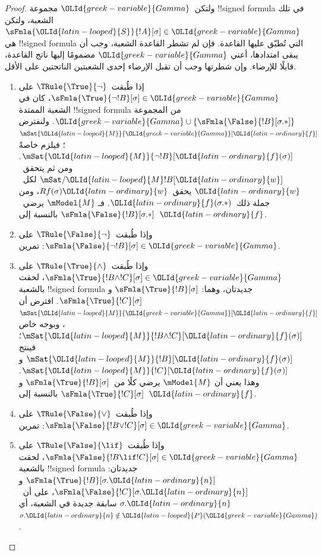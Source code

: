 \documentclass[../../../include/open-logic-section]{subfiles}
\begin{document}
\begin{proof}
ولتكن~${\OLId{greek-variable}{Gamma}}$ مجموعة !!{signed formula} في تلك الشعبة، ولتكن
$\sFmla{{\OLId{latin-looped}{S}}}{!A}[\sigma] \in {\OLId{greek-variable}{Gamma}}$ هي !!{signed formula} التي تُطبّق
عليها القاعدة. فإن لم تشطر القاعدة الشعبة، وجب أن يبقى امتدادها، أعني
${\OLId{greek-variable}{Gamma}}$ مضمومًا إليها ناتج القاعدة، قابلًا للإرضاء. وإن شطرتها وجب أن
تقبل الإرضاء إحدى الشعبتين الناتجتين على الأقل.
\begin{enumerate}
\item إذا طُبقت~$\TRule{\True}{\lnot}$ على
  $\sFmla{\True}{\lnot !B}[\sigma] \in {\OLId{greek-variable}{Gamma}}$، كان في الشعبة
  الممتدة !!{signed formula} من المجموعة
  ${\OLId{greek-variable}{Gamma}} \cup \{\sFmla{\False}{!B}[\sigma.{*}]\}$. ولنفترض
  $\mSat{{\OLId{latin-looped}{M}}}{{\OLId{greek-variable}{Gamma}}}[{\OLId{latin-ordinary}{f}}]$؛ فيلزم خاصةً
  $\mSat{{\OLId{latin-looped}{M}}}{\lnot !B}[{\OLId{latin-ordinary}{f}}(\sigma)]$. ومن ثم يتحقق~$\mSat/{{\OLId{latin-looped}{M}}}{!B}[{\OLId{latin-ordinary}{w}}]$
  لكل~${\OLId{latin-ordinary}{w}}$ يحقق~$Rf(\sigma){\OLId{latin-ordinary}{w}}$، ومن جملة ذلك~${\OLId{latin-ordinary}{f}}(\sigma.{*})$. فـ
  $\mModel{M}$ يرضي~$\sFmla{\False}{!B}[\sigma.{*}]$ بالنسبة إلى~${\OLId{latin-ordinary}{f}}$.
\item وإذا طُبقت~$\TRule{\False}{\lnot}$ على
  $\sFmla{\False}{\lnot !B}[\sigma] \in {\OLId{greek-variable}{Gamma}}$: تمرين.
\item وإذا طُبقت~$\TRule{\True}{\land}$ على
  $\sFmla{\True}{!B \land !C}[\sigma] \in {\OLId{greek-variable}{Gamma}}$، لحقت بالشعبة
  !!{signed formula} جديدتان، وهما:
  $\sFmla{\True}{!B}[\sigma]$ و$\sFmla{\True}{!C}[\sigma]$. افترض أن
  $\mSat{{\OLId{latin-looped}{M}}}{{\OLId{greek-variable}{Gamma}}}[{\OLId{latin-ordinary}{f}}]$، وبوجه خاص
  $\mSat{{\OLId{latin-looped}{M}}}{!B \land !C}[{\OLId{latin-ordinary}{f}}(\sigma)]$؛ فينتج
  $\mSat{{\OLId{latin-looped}{M}}}{!B}[{\OLId{latin-ordinary}{f}}(\sigma)]$ و$\mSat{{\OLId{latin-looped}{M}}}{!C}[{\OLId{latin-ordinary}{f}}(\sigma)]$. وهذا يعني أن
  $\mModel{M}$ يرضي كلًا من~$\sFmla{\True}{!B}[\sigma]$
  و$\sFmla{\True}{!C}[\sigma]$ بالنسبة إلى~${\OLId{latin-ordinary}{f}}$.
\item وإذا طُبقت~$\TRule{\False}{\lor}$ على
  $\sFmla{\False}{!B \lor !C}[\sigma] \in {\OLId{greek-variable}{Gamma}}$: تمرين.
\item وإذا طُبقت~$\TRule{\False}{\lif}$ على
  $\sFmla{\False}{!B \lif !C}[\sigma] \in {\OLId{greek-variable}{Gamma}}$، لحقت بالشعبة
  !!{signed formula} جديدتان:
  $\sFmla{\True}{!B}[\sigma.{\OLId{latin-ordinary}{n}}]$ و$\sFmla{\False}{!C}[\sigma.{\OLId{latin-ordinary}{n}}]$،
  على أن~$\sigma.{\OLId{latin-ordinary}{n}}$ سابقة جديدة في الشعبة، أي
  $\sigma.{\OLId{latin-ordinary}{n}} \notin {\OLId{latin-looped}{P}}({\OLId{greek-variable}{Gamma}})$.


\end{enumerate}
\end{proof}
\end{document}
